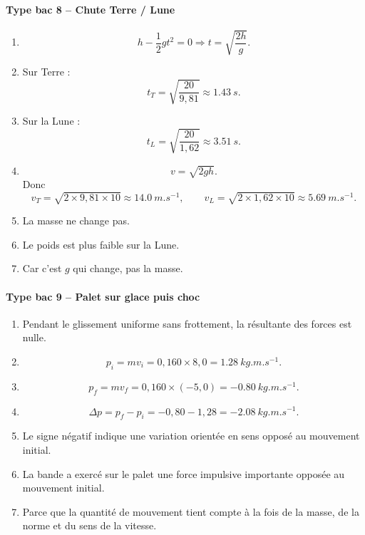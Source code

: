 \documentclass[11pt,a4paper]{article}
\theoremstyle{definition}
\begin{document}
\paragraph{Type bac 8 -- Chute Terre / Lune}
\begin{enumerate}[label=\arabic*.]
    \item
    \[
    h-\frac12 gt^2=0 \Rightarrow t=\sqrt{\frac{2h}{g}}.
    \]
    \item Sur Terre :
    \[
    t_T=\sqrt{\frac{20}{9,81}}\approx \SI{1,43}{s}.
    \]
    \item Sur la Lune :
    \[
    t_L=\sqrt{\frac{20}{1,62}}\approx \SI{3,51}{s}.
    \]
    \item
    \[
    v=\sqrt{2gh}.
    \]
    Donc
    \[
    v_T=\sqrt{2\times9,81\times10}\approx \SI{14,0}{m.s^{-1}},
    \qquad
    v_L=\sqrt{2\times1,62\times10}\approx \SI{5,69}{m.s^{-1}}.
    \]
    \item La masse ne change pas.
    \item Le poids est plus faible sur la Lune.
    \item Car c’est $g$ qui change, pas la masse.
\end{enumerate}

\paragraph{Type bac 9 -- Palet sur glace puis choc}
\begin{enumerate}[label=\arabic*.]
    \item Pendant le glissement uniforme sans frottement, la résultante des forces est nulle.
    \item
    \[
    p_i=mv_i=0,160\times 8,0=\SI{1,28}{kg.m.s^{-1}}.
    \]
    \item
    \[
    p_f=mv_f=0,160\times(-5,0)=\SI{-0,80}{kg.m.s^{-1}}.
    \]
    \item
    \[
    \Delta p=p_f-p_i=-0,80-1,28=\SI{-2,08}{kg.m.s^{-1}}.
    \]
    \item Le signe négatif indique une variation orientée en sens opposé au mouvement initial.
    \item La bande a exercé sur le palet une force impulsive importante opposée au mouvement initial.
    \item Parce que la quantité de mouvement tient compte à la fois de la masse, de la norme et du sens de la vitesse.
\end{enumerate}
\end{document}
